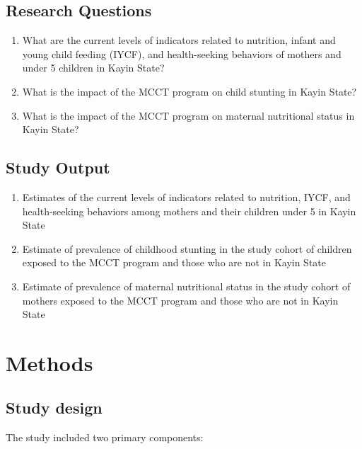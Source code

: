\documentclass[12pt,a4paper]{article}
\begin{document}
\hypertarget{research-questions}{%
\subsection{Research Questions}\label{research-questions}}

\begin{enumerate}
\def\labelenumi{\arabic{enumi}.}
\item
  What are the current levels of indicators related to nutrition, infant and young child feeding (IYCF), and health-seeking behaviors of mothers and under 5 children in Kayin State?
\item
  What is the impact of the MCCT program on child stunting in Kayin State?
\item
  What is the impact of the MCCT program on maternal nutritional status in Kayin State?
\end{enumerate}

\hypertarget{study-outputs}{%
\subsection{Study Output}\label{study-outputs}}

\begin{enumerate}
\def\labelenumi{\arabic{enumi}.}
\item
  Estimates of the current levels of indicators related to nutrition, IYCF, and health-seeking behaviors among mothers and their children under 5 in Kayin State
\item
  Estimate of prevalence of childhood stunting in the study cohort of children exposed to the MCCT program and those who are not in Kayin State
\item
  Estimate of prevalence of maternal nutritional status in the study cohort of mothers exposed to the MCCT program and those who are not in Kayin State
\end{enumerate}

\hypertarget{methods}{%
\section{Methods}\label{methods}}

\hypertarget{design}{%
\subsection{Study design}\label{design}}

The study included two primary components:
\end{document}
